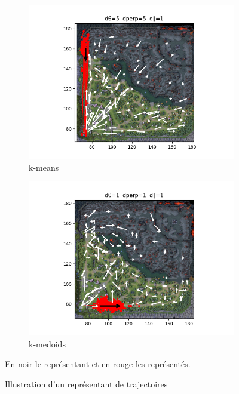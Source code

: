 \begin{figure}[h!]
     \centering
     \begin{subfigure}[b]{0.4\textwidth}
         \centering
         \includegraphics[width=\textwidth]{Images/kmeans/kmeans_long_traj.png}
         \caption{k-means}
         \label{fig:kmean_long}
     \end{subfigure}
     \hfill
     \begin{subfigure}[b]{0.4\textwidth}
         \centering
         \includegraphics[width=\textwidth]{Images/kmedoid/kmed_long_traj.png}
         \caption{k-medoids}
         \label{fig:kmed_long}
     \end{subfigure}

     En noir le représentant et en rouge les représentés.
     \caption{Illustration d'un représentant de trajectoires}
     \label{fig:long}
\end{figure}

